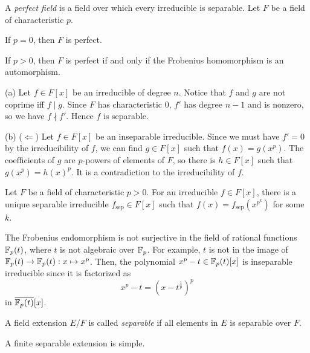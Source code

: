 \documentclass{../../large}
\newcommand{\sep}{\mathrm{sep}}
\begin{document}
\begin{prb}
A \emph{perfect field} is a field over which every irreducible is separable.
Let $F$ be a field of characteristic $p$.
\begin{parts}
\item If $p=0$, then $F$ is perfect.
\item If $p>0$, then $F$ is perfect if and only if the Frobenius homomorphism is an automorphism.
\end{parts}
\end{prb}
\begin{pf}
(a)
Let $f\in F[x]$ be an irreducible of degree $n$.
Notice that $f$ and $g$ are not coprime iff $f\mid g$.
Since $F$ has characteristic 0, $f'$ has degree $n-1$ and is nonzero, so we have $f\nmid f'$.
Hence $f$ is separable.

(b)
($\Leftarrow$)
Let $f\in F[x]$ be an inseparable irreducible.
Since we must have $f'=0$ by the irreducibility of $f$, we can find $g\in F[x]$ such that $f(x)=g(x^p)$.
The coefficients of $g$ are $p$-powers of elements of $F$, so there is $h\in F[x]$ such that $g(x^p)=h(x)^p$.
It is a contradiction to the irreducibility of $f$.
\end{pf}

\begin{prb}
Let $F$ be a field of characteristic $p>0$.
For an irreducible $f\in F[x]$, there is a unique separable irreducible $f_\sep\in F[x]$ such that $f(x)=f_\sep(x^{p^k})$ for some $k$.
\end{prb}

\begin{ex}
The Frobenius endomorphism is not surjective in the field of rational functions $\mathbb{F}_p(t)$, where $t$ is not algebraic over $\mathbb{F}_p$.
For example, $t$ is not in the image of $\mathbb{F}_p(t)\to\mathbb{F}_p(t):x\mapsto x^p$.
Then, the polynomial $x^p-t\in\mathbb{F}_p(t)[x]$ is inseparable irreducible since it is factorized as
\[x^p-t=(x-t^{\frac1p})^p\]
in $\overline{\mathbb{F}_p(t)}[x]$.
\end{ex}


\begin{prb}
A field extension $E/F$ is called \emph{separable} if all elements in $E$ is separable over $F$.
\end{prb}

\begin{prb}
A finite separable extension is simple.
\end{prb}
\end{document}
